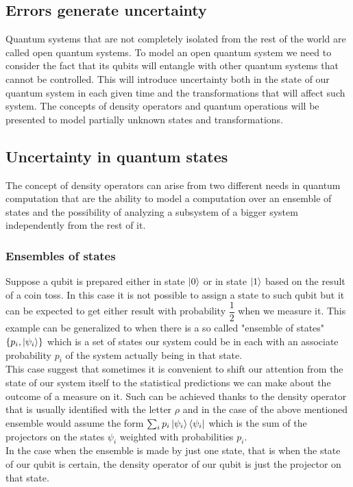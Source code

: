 \documentclass{article}
\begin{document}
\subsection{Errors generate uncertainty}

Quantum systems that are not completely isolated from the rest of
the world are called open quantum systems.
To model an open quantum system we need to consider the fact that
its qubits will entangle with other quantum systems that cannot be controlled.
This will introduce uncertainty both in the state of our quantum
system in each given time and the transformations that will affect such system.
The concepts of density operators and quantum operations will be presented to
model partially unknown states and transformations.


\subsection{Uncertainty in quantum states}

The concept of density operators can arise from two different needs in quantum
computation that are the ability to model a computation over an ensemble of states
and the possibility of analyzing a subsystem of a bigger system independently from
the rest of it.

\subsubsection{Ensembles of states}

Suppose a qubit is prepared either in state $\ket{0}$ or in
state $\ket{1}$ based on the result of a coin toss.
In this case it is not possible to assign a state to such qubit
but it can be expected to get either result with probability
$\dfrac{1}{2}$  when we measure it.
This example can be generalized to when there is a so called
"ensemble of states" $\{p_i,\ket{\psi_i}\}$ which is a set of
states our system could be in each with an associate probability $p_i$
of the system actually being in that state.\\
This case suggest that sometimes it is convenient to
shift our attention from the state of our system itself to the
statistical predictions we can make about the outcome of a measure on it.
Such can be achieved thanks to the density operator that
is usually identified with the letter $\rho$ and in the case of the above
mentioned ensemble would assume the form $\sum_i p_i \ket{\psi_i}\bra{\psi_i}$
which is the sum of the projectors on the states $\psi_i$ weighted with
probabilities $p_i$. \\
In the case when the ensemble is made by just one state,
that is when the state of our qubit is certain,
the density operator of our qubit is just the projector on
that state.
\end{document}
